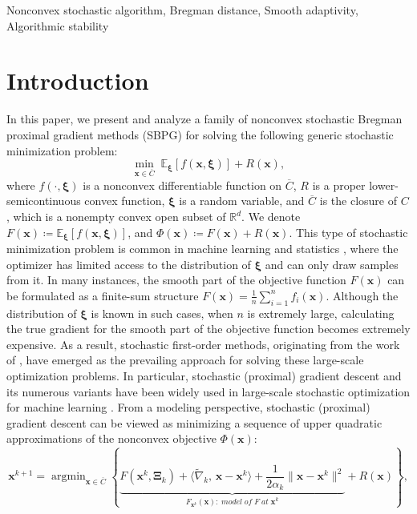 \documentclass[twoside,11pt]{article}
\newcommand{\R}{\mathbb R}
\newcommand{\E}{\mathbb{E}}
\DeclareMathOperator*{\argmin}{argmin}
\def\inprod#1#2{\langle#1,\,#2\rangle}
\def\vx{{\bm{x}}}
\begin{document}
\begin{keywords}
 Nonconvex stochastic algorithm, Bregman distance, Smooth adaptivity, Algorithmic stability
\end{keywords}

\section{Introduction}\label{sec-introduction}
In this paper, we present and analyze a family of nonconvex stochastic Bregman proximal gradient methods (SBPG) for solving the following generic stochastic minimization problem:
\begin{equation}
\min_{\vx\in \overline{C}}\;\E_{{\bm\xi}}[f(\vx,{\bm\xi})]+R(\vx),
\label{min-prob}
\end{equation}
where $f(\cdot,{\bm\xi})$ is a nonconvex differentiable function on $\overline{C}$, $R$ is a proper lower-semicontinuous convex function, ${\bm\xi}$ is a random variable, and $\overline{C}$ is the closure of $C$, which is a nonempty convex open subset of $\R^d$. We denote $F(\vx)\coloneqq\E_{{\bm\xi}}[f(\vx,{\bm\xi})]$, and $\Phi(\vx)\coloneqq F(\vx)+R(\vx)$. This type of stochastic minimization problem is common in machine learning and statistics \citep{hastie2009elements, shapiro2021lectures, zhang2004solving}, where the optimizer has limited access to the distribution of $\bm\xi$ and can only draw samples from it. In many instances, the smooth part of the objective function $F(\vx)$ can be formulated as a finite-sum structure $F(\vx)=\frac{1}{n}\sum_{i=1}^nf_i(\vx)$. Although the distribution of $\bm\xi$ is known in such cases, when $n$ is extremely large, calculating the true gradient for the smooth part of the objective function becomes extremely expensive. As a result, stochastic first-order methods, originating from the work of \citet{robbins1951stochastic}, have emerged as the prevailing approach for solving these large-scale optimization problems. In particular, stochastic (proximal) gradient descent and its numerous variants \citep{duchi2011adaptive,duchi2009efficient,gu2020unified,kingma2014adam,JMLR:v18:16-410,wang2022riemannian} have been widely used in large-scale stochastic optimization for machine learning \citep{lecun2015deep,shapiro2021lectures,zhang2004solving}. From a modeling perspective, stochastic (proximal) gradient descent can be viewed as minimizing a sequence of upper quadratic approximations of the nonconvex objective $\Phi(\vx)$:
\begin{equation}
{\vx^{k+1}}=\argmin_{\vx\in \overline{C}}\left\{\underbrace{F({\vx^k},{\bm\Xi}_{k})+\inprod{\widetilde\nabla_k}{\vx-{\vx^k}}+\frac{1}{2\alpha_k}\|\vx-{\vx^k}\|^2}_{F_{{\vx^k}}(\vx):\;model\;of\;F\;at\;{\vx^k}}+R(\vx)\right\},
\label{convention-model} 
\end{equation}
\end{document}
